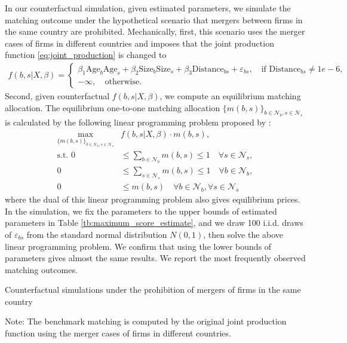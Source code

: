 \documentclass[10pt]{article}
\begin{document}
In our counterfactual simulation, given estimated parameters, we simulate the matching outcome under the hypothetical scenario that mergers between firms in the same country are prohibited. 
Mechanically, first, this scenario uses the merger cases of firms in different countries and imposes that 
the joint production function \eqref{eq:joint_production} is changed to
\begin{align*}
    f(b,s|X,\beta)= \begin{cases}
        \beta_1 \text{Age}_{b}\text{Age}_{s} + \beta_2 \text{Size}_{b}\text{Size}_{s} + \beta_3 \text{Distance}_{bs} + \varepsilon_{bs}, \quad \text{if }\text{Distance}_{bs}\neq 1e-6,\\
        -\infty, \quad \text{otherwise}.
    \end{cases}
\end{align*}
Second, given counterfactual $f(b,s|X,\beta)$, we compute an equilibrium matching allocation. 
The equilibrium one-to-one matching allocation $\{m(b,s)\}_{b\in\mathcal{N}_b,s\in\mathcal{N}_s}$ is calculated by the following linear programming problem proposed by \cite{shapley1971assignment}:
\begin{align*}
    \max_{\{m(b,s)\}_{b\in\mathcal{N}_b,s\in\mathcal{N}_s}} &f(b,s|X,\beta)\cdot m(b,s),\\
    \text{s.t. } 0&\le \sum_{b\in\mathcal{N}_b}m(b,s)\le 1\quad  \forall s \in \mathcal{N}_s,\\
    0&\le \sum_{s\in\mathcal{N}_s}m(b,s)\le 1\quad \forall b \in \mathcal{N}_b,\\
    0&\le m(b,s) \quad \forall b \in \mathcal{N}_b,\forall s \in \mathcal{N}_s
\end{align*}
where the dual of this linear programming problem also gives equilibrium prices. 
In the simulation, we fix the parameters to the upper bounds of estimated parameters in Table \ref{tb:maximum_score_estimate}, and we draw 100 i.i.d. draws of $\varepsilon_{bs}$ from the standard normal distribution $N(0,1)$, then solve the above linear programming problem.
We confirm that using the lower bounds of parameters gives almost the same results.
We report the most frequently observed matching outcomes.

\begin{table}[!htbp]
  \begin{center}
      \caption{Counterfactual simulations under the prohibition of mergers of firms in the same country}
      \label{tb:number_of_mergers_counterfactual} 
      
  \end{center}\footnotesize
  Note: The benchmark matching is computed by the original joint production function using the merger cases of firms in different countries.
\end{table} 
\end{document}
